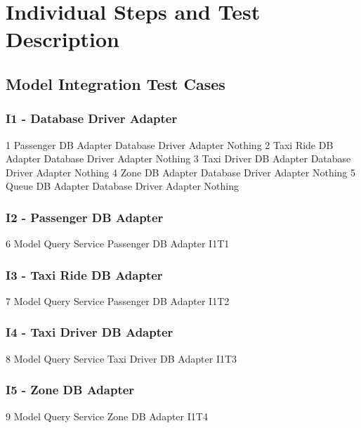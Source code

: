 \section{Individual Steps and Test Description}

\subsection{Model Integration Test Cases}
\subsubsection{I1 - Database Driver Adapter}
\testCaseSimpleSimple
	{1}
	{Passenger DB Adapter}
	{Database Driver Adapter}
	{Nothing}
\testCaseSimpleSimple
	{2}
	{Taxi Ride DB Adapter}
	{Database Driver Adapter}
	{Nothing}
\testCaseSimpleSimple
	{3}
	{Taxi Driver DB Adapter}
	{Database Driver Adapter}
	{Nothing}
\testCaseSimpleSimple
	{4}
	{Zone DB Adapter}
	{Database Driver Adapter}
	{Nothing}
\testCaseSimpleSimple
	{5}
	{Queue DB Adapter}
	{Database Driver Adapter}
	{Nothing}
\subsubsection{I2 - Passenger DB Adapter}
\testCaseSimpleSimple
	{6}
	{Model Query Service}
	{Passenger DB Adapter}
	{I1T1}
\subsubsection{I3 - Taxi Ride DB Adapter}
\testCaseSimpleSimple
	{7}
	{Model Query Service}
	{Passenger DB Adapter}
	{I1T2}
\subsubsection{I4 - Taxi Driver DB Adapter}
\testCaseSimpleSimple
	{8}
	{Model Query Service}
	{Taxi Driver DB Adapter}
	{I1T3}
\subsubsection{I5 - Zone DB Adapter}
\testCaseSimpleSimple
	{9}
	{Model Query Service}
	{Zone DB Adapter}
	{I1T4}
